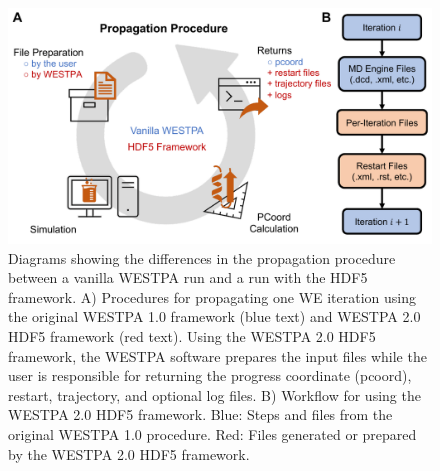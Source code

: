 \begin{figure}[t]
\centering
\includegraphics[width=\columnwidth]{figures/Figure5_membrane.pdf}
\caption{Diagrams showing the differences in the propagation procedure between a vanilla WESTPA run and a run with the HDF5 framework. 
A) Procedures for propagating one WE iteration using the original WESTPA 1.0 framework (blue text) and WESTPA 2.0 HDF5 framework (red text). 
Using the WESTPA 2.0 HDF5 framework, the WESTPA software prepares the input files while the user is responsible for returning the progress coordinate (pcoord), restart, trajectory, and optional log files. 
B) Workflow for using the WESTPA 2.0 HDF5 framework. 
Blue: Steps and files from the original WESTPA 1.0 procedure. 
Red: Files generated or prepared by the WESTPA 2.0 HDF5 framework. }
\label{fig:we-hdf5}
\end{figure}

